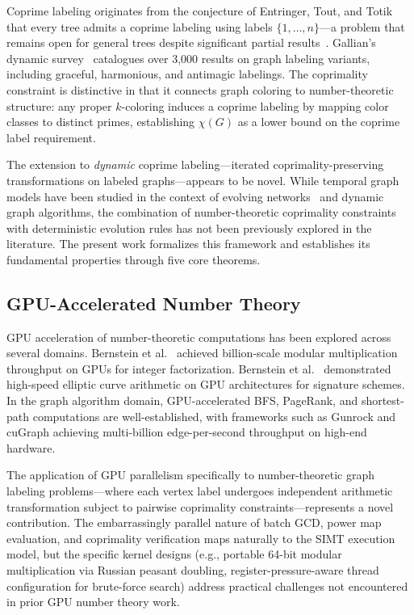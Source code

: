 \documentclass[lettersize,journal]{IEEEtran}
\begin{document}
Coprime labeling originates from the conjecture of Entringer, Tout, and Totik that every tree admits a coprime labeling using labels $\{1, \ldots, n\}$---a problem that remains open for general trees despite significant partial results~\cite{gallian2021}. Gallian's dynamic survey~\cite{gallian2021} catalogues over 3{,}000 results on graph labeling variants, including graceful, harmonious, and antimagic labelings. The coprimality constraint is distinctive in that it connects graph coloring to number-theoretic structure: any proper $k$-coloring induces a coprime labeling by mapping color classes to distinct primes, establishing $\chi(G)$ as a lower bound on the coprime label requirement.

The extension to \emph{dynamic} coprime labeling---iterated coprimality-preserving transformations on labeled graphs---appears to be novel. While temporal graph models have been studied in the context of evolving networks~\cite{bondy2008} and dynamic graph algorithms, the combination of number-theoretic coprimality constraints with deterministic evolution rules has not been previously explored in the literature. The present work formalizes this framework and establishes its fundamental properties through five core theorems.

\subsection{GPU-Accelerated Number Theory}

GPU acceleration of number-theoretic computations has been explored across several domains. Bernstein et al.~\cite{bernstein2014} achieved billion-scale modular multiplication throughput on GPUs for integer factorization. Bernstein et al.~\cite{bernstein2012} demonstrated high-speed elliptic curve arithmetic on GPU architectures for signature schemes. In the graph algorithm domain, GPU-accelerated BFS, PageRank, and shortest-path computations are well-established, with frameworks such as Gunrock and cuGraph achieving multi-billion edge-per-second throughput on high-end hardware.

The application of GPU parallelism specifically to number-theoretic graph labeling problems---where each vertex label undergoes independent arithmetic transformation subject to pairwise coprimality constraints---represents a novel contribution. The embarrassingly parallel nature of batch GCD, power map evaluation, and coprimality verification maps naturally to the SIMT execution model, but the specific kernel designs (e.g., portable 64-bit modular multiplication via Russian peasant doubling, register-pressure-aware thread configuration for brute-force search) address practical challenges not encountered in prior GPU number theory work.
\end{document}
